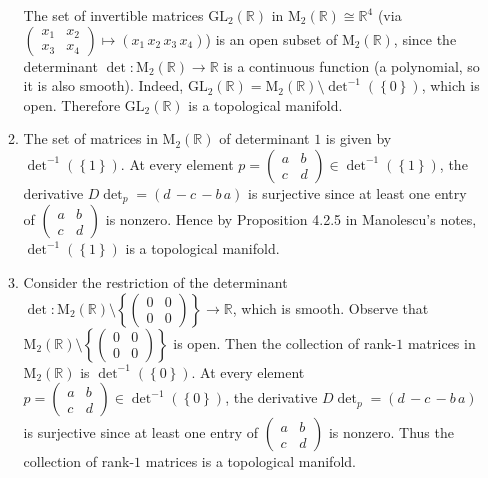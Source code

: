 \documentclass[11pt,leqno]{article}
\theoremstyle{plain}
\theoremstyle{definition}
\numberwithin{equation}{section}
\numberwithin{lem}{section}
\newcommand{\cbr}[1]{\left\{#1\right\}}
\newcommand{\M}{\mathrm{M}}
\newcommand{\GL}{\mathrm{GL}}
\begin{document}
\begin{enumerate}
\begin{enumerate}
      The set of invertible matrices $\GL_2(\mathbb R)$ in $\M_2(\mathbb R) \cong \mathbb R^4$ (via $(\!\begin{smallmatrix}
      x_1 & x_2 \\ x_3 & x_4
      \end{smallmatrix}\!)\mapsto (x_1 \, x_2 \, x_3 \, x_4)$) is an open subset of $\M_2(\mathbb R)$, since the determinant $\det\colon \M_2(\mathbb R)\to \mathbb R$ is a continuous function (a polynomial, so it is also smooth). Indeed, $\GL_2(\mathbb R) = \M_2(\mathbb R)\setminus \det^{-1}(\cbr{0})$, which is open. Therefore $\GL_2(\mathbb R)$ is a topological manifold.
      \item The set of matrices in $\M_2(\mathbb R)$ of determinant $1$ is given by $\det^{-1}(\cbr{1})$. At every element $p = (\!\begin{smallmatrix}
      a & b \\ c & d
      \end{smallmatrix}\!) \in \det^{-1}(\cbr{1})$, the derivative $D\det_p = (d \, -c \, -b \, a)$ is surjective since at least one entry of $(\!\begin{smallmatrix}
        a & b \\ c & d
      \end{smallmatrix}\!)$ is nonzero. Hence by Proposition 4.2.5 in Manolescu's notes, $\det^{-1}(\cbr{1})$ is a topological manifold.
      \item Consider the restriction of the determinant $\det\colon \M_2(\mathbb R)\setminus\cbr{(\!\begin{smallmatrix}
        0 & 0 \\ 0 & 0
        \end{smallmatrix}\!)}\to \mathbb R$, which is smooth. Observe that $\M_2(\mathbb R)\setminus\cbr{(\!\begin{smallmatrix}
          0 & 0 \\ 0 & 0
          \end{smallmatrix}\!)}$ is open. Then the collection of rank-$1$ matrices in $\M_2(\mathbb R)$ is $\det^{-1}(\cbr{0})$. At every element $p = (\!\begin{smallmatrix}
      a & b \\ c & d
      \end{smallmatrix}\!) \in \det^{-1}(\cbr{0})$, the derivative $D\det_p = (d \, -c \, -b \, a)$ is surjective since at least one entry of $(\!\begin{smallmatrix}
        a & b \\ c & d
      \end{smallmatrix}\!)$ is nonzero. Thus the collection of rank-$1$ matrices is a topological manifold.

\end{enumerate}
\end{enumerate}
\end{document}
